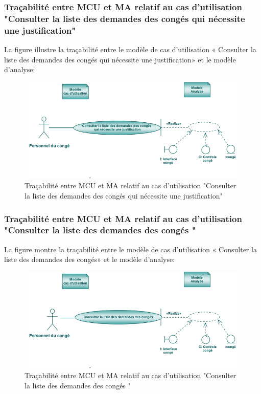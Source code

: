 \documentclass[12 pt ]{report}
\begin{document}
\subsubsection{Traçabilité entre MCU et MA relatif au cas d’utilisation "Consulter la liste des demandes des congés qui nécessite une justification" }
La figure  illustre la traçabilité entre le modèle de cas d’utilisation « Consulter la liste des demandes des congés qui nécessite une justification» et le modèle d’analyse:
\begin{figure}[h]
\begin{center}
\includegraphics[width= 12cm , height =5cm]{tj.PNG}
\caption{Traçabilité entre MCU et MA relatif au cas d’utilisation "Consulter la liste des demandes des congés qui nécessite une justification"}
\end{center}
\end{figure}
\subsubsection{Traçabilité entre MCU et MA relatif au cas d’utilisation "Consulter la liste des demandes des congés " }
La figure  montre la traçabilité entre le modèle de cas d’utilisation « Consulter la liste des demandes des congés» et le modèle d’analyse:
\begin{figure}[h]
\begin{center}
\includegraphics[width= 12cm , height =5cm]{cdcc.PNG}
\caption{Traçabilité entre MCU et MA relatif au cas d’utilisation "Consulter la liste des demandes des congés "}
\end{center}
\end{figure}
\end{document}
